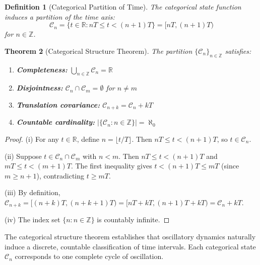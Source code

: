 \documentclass[twocolumn,10pt,a4paper]{article}
\newtheorem{theorem}{Theorem}[section]
\newtheorem{definition}[theorem]{Definition}
\newcommand{\R}{\mathbb{R}}
\newcommand{\Z}{\mathbb{Z}}
\begin{document}
\begin{definition}[Categorical Partition of Time]
The categorical state function induces a partition of the time axis:
\begin{equation}
\mathcal{C}_n = \{t \in \R : nT \leq t < (n+1)T\} = [nT, (n+1)T)
\end{equation}
for $n \in \Z$.
\end{definition}

\begin{theorem}[Categorical Structure Theorem]
\label{thm:categorical}
The partition $\{\mathcal{C}_n\}_{n \in \Z}$ satisfies:
\begin{enumerate}[label=(\roman*)]
    \item \textbf{Completeness:} $\bigcup_{n \in \Z} \mathcal{C}_n = \R$
    \item \textbf{Disjointness:} $\mathcal{C}_n \cap \mathcal{C}_m = \emptyset$ for $n \neq m$
    \item \textbf{Translation covariance:} $\mathcal{C}_{n+k} = \mathcal{C}_n + kT$
    \item \textbf{Countable cardinality:} $|\{\mathcal{C}_n : n \in \Z\}| = \aleph_0$
\end{enumerate}
\end{theorem}

\begin{proof}
(i) For any $t \in \R$, define $n = \lfloor t/T \rfloor$. Then $nT \leq t < (n+1)T$, so $t \in \mathcal{C}_n$.

(ii) Suppose $t \in \mathcal{C}_n \cap \mathcal{C}_m$ with $n < m$. Then $nT \leq t < (n+1)T$ and $mT \leq t < (m+1)T$. The first inequality gives $t < (n+1)T \leq mT$ (since $m \geq n+1$), contradicting $t \geq mT$.

(iii) By definition, $\mathcal{C}_{n+k} = [(n+k)T, (n+k+1)T) = [nT + kT, (n+1)T + kT) = \mathcal{C}_n + kT$.

(iv) The index set $\{n : n \in \Z\}$ is countably infinite.
\end{proof}

The categorical structure theorem establishes that oscillatory dynamics naturally induce a discrete, countable classification of time intervals. Each categorical state $\mathcal{C}_n$ corresponds to one complete cycle of oscillation.
\end{document}
